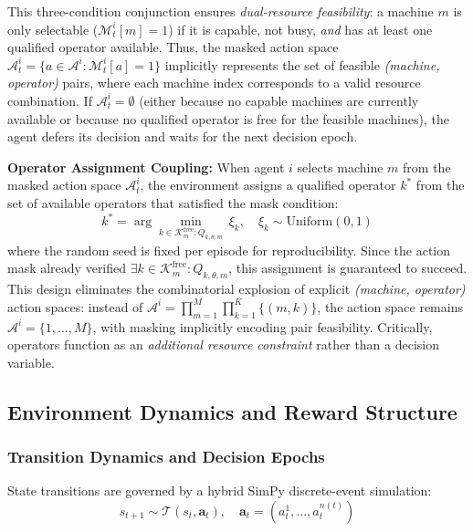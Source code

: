 This three-condition conjunction ensures \textit{dual-resource feasibility}: a machine \( m \) is only selectable (\( \mathcal{M}_t^i[m] = 1 \)) if it is capable, not busy, \textit{and} has at least one qualified operator available. Thus, the masked action space \( \mathcal{A}_t^i = \{ a \in \mathcal{A}^i : \mathcal{M}_t^i[a] = 1 \} \) implicitly represents the set of feasible \textit{(machine, operator)} pairs, where each machine index corresponds to a valid resource combination. If \( \mathcal{A}_t^i = \emptyset \) (either because no capable machines are currently available or because no qualified operator is free for the feasible machines), the agent defers its decision and waits for the next decision epoch.

\textbf{Operator Assignment Coupling:} When agent \( i \) selects machine \( m \) from the masked action space \( \mathcal{A}_t^i \), the environment assigns a qualified operator \( k^* \) from the set of available operators that satisfied the mask condition:
\[
k^* = \arg\min_{k \in \mathcal{K}_m^{\text{free}} : Q_{k,\theta,m}} \, \xi_k, \quad \xi_k \sim \text{Uniform}(0,1)
\]
where the random seed is fixed per episode for reproducibility. Since the action mask already verified \( \exists k \in \mathcal{K}_m^{\text{free}} : Q_{k,\theta,m} \), this assignment is guaranteed to succeed. This design eliminates the combinatorial explosion of explicit \textit{(machine, operator)} action spaces: instead of \( \mathcal{A}^i = \prod_{m=1}^M \prod_{k=1}^K \{(m,k)\} \), the action space remains \( \mathcal{A}^i = \{1,\ldots,M\} \), with masking implicitly encoding pair feasibility. Critically, operators function as an \textit{additional resource constraint} rather than a decision variable.


\subsection{Environment Dynamics and Reward Structure}

\subsubsection{Transition Dynamics and Decision Epochs}

State transitions are governed by a hybrid SimPy discrete-event simulation:
\begin{equation}
s_{t+1} \sim \mathcal{T}(s_t, \mathbf{a}_t), \quad \mathbf{a}_t = (a_t^1, \ldots, a_t^{n(t)})
\end{equation}

